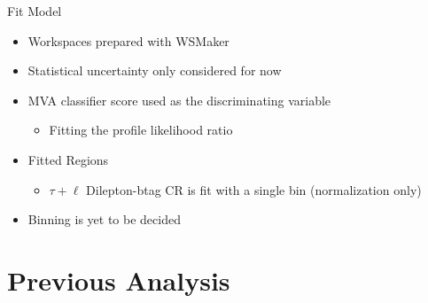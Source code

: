 \documentclass[aspectratio=169,xcolor=table]{beamer}
\begin{document}
    \begin{frame}[t]{Fit Model}
      \begin{itemize}
        \item Workspaces prepared with WSMaker
        \item Statistical uncertainty only considered for now
        \item MVA classifier score used as the discriminating variable
        \begin{itemize}
          \item Fitting the profile likelihood ratio
        \end{itemize}
        \item Fitted Regions
          \begin{itemize}
            \item $\tau+\ell$ Dilepton-btag CR is fit with a single bin (normalization only)
          \end{itemize}
          \centering
        \begin{table}
            \tiny
          \end{table}
          \raggedright
          \item Binning is yet to be decided
      \end{itemize}
    \end{frame}

  \section{Previous Analysis}
\end{document}
